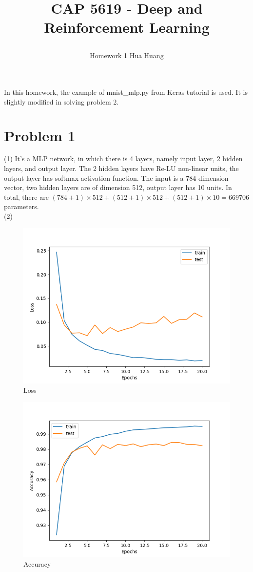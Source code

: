 \documentclass[12pt]{article}
\begin{document}
\title*{\centerline{\huge{CAP 5619 \-- Deep and Reinforcement Learning}}}
\author*{\centerline{Homework 1 Hua Huang}}%

In this homework, the example of mnist\_mlp.py from Keras tutorial is
used. It is slightly modified in solving problem 2.
\section{Problem 1}
(1) It's a MLP network, in which there is 4 layers, namely input layer, 2 hidden
 layers, and output layer. The 2 hidden layers have Re\--LU non\--linear units,
the output layer has softmax activation function. The input is a 784 dimension 
vector, two hidden layers are of dimension 512, output layer has 10 units.
In total, there are $(784+1)\times 512+(512+1)\times 512+(512+1)\times 10=669706$ parameters.\\
(2)
\begin{figure}[h]
    \centering
    \includegraphics [scale=0.5]{Figure_0.png}
    \caption {Loss}
\end{figure}
\begin{figure}[h]
    \centering
    \includegraphics [scale=0.5]{Figure_1.png}
    \caption {Accuracy}
\end{figure}
\newpage
\end{document}
